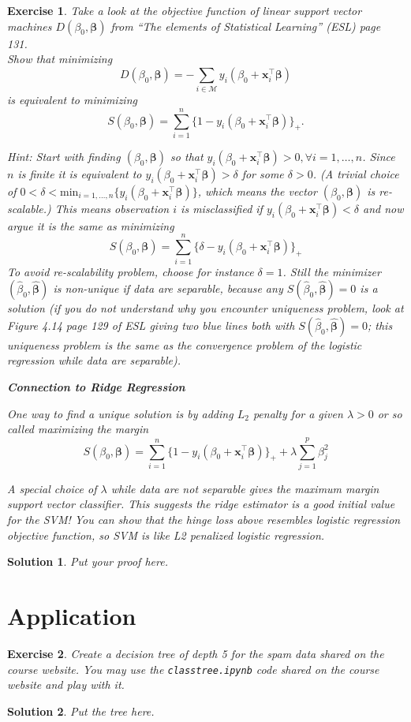\documentclass[12pt,a4paper]{article}
\newtheorem{exercise}{Exercise}
\numberwithin{exercise}{section} %
\newtheorem{solution}{Solution}
\numberwithin{solution}{section} %
\begin{document}
\begin{exercise}
Take a look at the objective function of linear support vector machines $D(\beta_0,\boldsymbol \beta)$ from ``The elements of Statistical Learning'' (ESL) page 131.\\
Show that minimizing 
$$D(\beta_0,\boldsymbol \beta)=-\sum\limits_{i\in\mathcal M}
y_i(\beta_0 + \mathbf x_i^\top \boldsymbol \beta )$$ 
is equivalent to minimizing 
$$S(\beta_0,\boldsymbol \beta)=\sum
_{i=1}^n \{1-y_i(\beta_0+\mathbf x_i^\top\boldsymbol \beta)\}_+.$$


\smallskip
Hint: Start with finding $(\beta_0,\boldsymbol \beta)$ so that $y_i(\beta_0+\mathbf  x_i^\top\boldsymbol \beta) >0, \forall i=1,\ldots,n$. Since $n$ is finite it is equivalent to $y_i(\beta_0+\mathbf x_i^\top\boldsymbol \beta) >\delta$  for some $\delta>0$. (A trivial choice of $0<\delta<\mathrm{min}_{i=1,\ldots,n} \{y_i(\beta_0+\mathbf  x_i^\top\boldsymbol \beta)\} $, which means the vector $(\beta_0,\boldsymbol \beta)$ is re-scalable.) 
\bigskip
This means observation $i$ is misclassified if $y_i(\beta_0+\mathbf  x_i^\top\boldsymbol \beta)<\delta$ and now argue it is the same as minimizing 
$$S(\beta_0,\boldsymbol \beta)=\sum_{i=1}^n \{\delta-y_i(\beta_0+\mathbf  x_i^\top\boldsymbol \beta)\}_+$$ To avoid re-scalability problem, choose for instance $\delta=1$. Still the minimizer $(\hat \beta_0,\hat{\boldsymbol \beta})$ is non-unique if data are separable, because any $S(\hat\beta_0,\hat{\boldsymbol \beta})=0$ is a solution (if you do not understand why you encounter uniqueness problem, look at Figure 4.14 page 129 of ESL giving two blue lines both with $S(\hat\beta_0,\hat{\boldsymbol \beta})=0$; this uniqueness problem is the same as the convergence problem of the logistic regression while data are separable).
\bigskip


{\bf Connection to Ridge Regression}


\bigskip


One way to find a unique solution is by adding $L_2$ penalty for a given $\lambda>0$ or so called maximizing the margin
$$S(\beta_0,\boldsymbol \beta)=\sum_{i=1}^n \{1-y_i(\beta_0+\mathbf  x_i^\top\boldsymbol \beta)\}_+ +\lambda \sum_{j=1}^p \beta_j^2$$

A special choice of $\lambda$ while data are not separable gives the maximum margin support vector classifier. This suggests the ridge estimator is a good initial value for the SVM! You can show that the hinge loss above resembles logistic regression objective function, so SVM is like L2 penalized logistic regression. 
\end{exercise}
\begin{solution}
Put your proof here.
\end{solution}

\newpage

\section{Application}
\begin{exercise}
Create a decision tree of depth 5 for the spam data shared on the course website. You may use the \texttt{classtree.ipynb} code shared on the course website and play with it. 
\end{exercise}
\begin{solution}
Put the tree here.
\end{solution}
\end{document}
